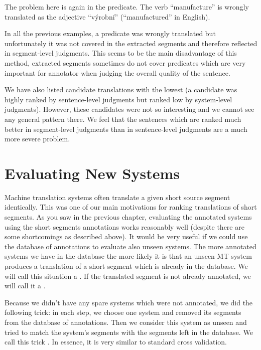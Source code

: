 The problem here is again in the predicate. The verb ``manufacture'' is wrongly
translated as the adjective ``výrobní'' (``manufactured'' in English).

In all the previous examples, a predicate was wrongly translated but
unfortunately it was not covered in the extracted segments and therefore
reflected in segment-level judgments. This seems to be the main disadvantage of
this method, extracted segments sometimes do not cover predicates which are
very important for annotator when judging the overall quality of the sentence.

We have also listed candidate translations with the lowest  (a candidate was highly ranked by sentence-level judgments but ranked low
by system-level judgments). However, these candidates were not so
interesting and we cannot see any general pattern there. We feel that the
sentences which are ranked much better in segment-level judgments than in
sentence-level judgments are a much more severe problem.

\section{Evaluating New Systems}
\label{evaluating-new-systems}

Machine translation systems often translate a given short source segment
identically.  This was one of our main motivations for ranking translations of
short segments.  As you saw in the previous chapter, evaluating the annotated
systems using the short segments annotations works reasonably well (despite
there are some shortcomings as described above).  It would be very useful if we
could use the database of annotations to evaluate also unseen systems. The more
annotated systems we have in the database the more likely it is that an unseen
MT system produces a translation of a short segment which is already in the
database. We will call this situation a .  If the translated
segment is not already annotated, we will call it a .

Because we didn't have any spare systems which were not annotated, we did the
following trick: in each step, we choose one system and removed its segments
from the database of annotations. Then we consider this system as unseen and
tried to match the system's segments with the segments left in the database. We
call this trick . In essence, it is very similar to
standard cross validation.

